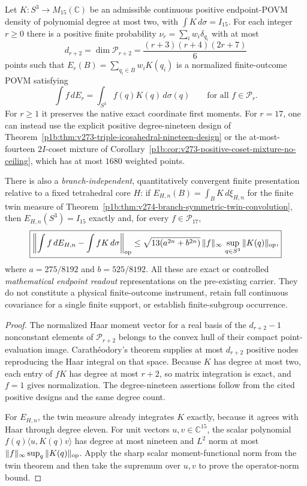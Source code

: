 \documentclass[11pt,a4paper]{article}
\begin{document}
\begin{corollary}
\label{p2f:cor:v274-finite-endpoint-moment-presentations}
Let $K:S^3\to M_{15}(\mathbb C)$ be an admissible continuous
positive endpoint-POVM density of polynomial degree at most two,
with $\int K\,d\sigma=I_{15}$. For each integer $r\ge0$ there is
a positive finite probability $\nu_r=\sum_iw_i\delta_{q_i}$ with
at most
\[
 d_{r+2}=\dim\mathcal P_{r+2}
   =\frac{(r+3)(r+4)(2r+7)}6
\]
points such that $E_r(B)=\sum_{q_i\in B}w_iK(q_i)$ is a normalized
finite-outcome POVM satisfying
\[
 \boxed{\int f\,dE_r=\int_{S^3}f(q)K(q)\,d\sigma(q)
       \qquad\text{for all } f\in\mathcal P_r.}
\]
For $r\ge1$ it preserves the native exact coordinate first moments.
For $r=17$, one can instead use the explicit positive degree-nineteen
design of Theorem~\ref{p1b:thm:v273-triple-icosahedral-nineteen-design}
or the at-most-fourteen $2I$-coset mixture of
Corollary~\ref{p1b:cor:v273-positive-coset-mixture-no-ceiling},
which has at most $1680$ weighted points.

There is also a \emph{branch-independent}, quantitatively convergent
finite presentation relative to a fixed tetrahedral core $H$: if
$E_{H,n}(B)=\int_BK\,d\xi_{H,n}$ for the finite twin measure of
Theorem~\ref{p1b:thm:v274-branch-symmetric-twin-convolution}, then
$E_{H,n}(S^3)=I_{15}$ exactly and, for every $f\in\mathcal P_{17}$,
\[
 \boxed{\left\|\int f\,dE_{H,n}-\int fK\,d\sigma\right\|_{\rm op}
 \le \sqrt{13(a^{2n}+b^{2n})}\,\|f\|_\infty\,
          \sup_{q\in S^3}\|K(q)\|_{\rm op},}
\]
where $a=275/8192$ and $b=525/8192$.
All these are exact or controlled \emph{mathematical endpoint readout}
representations on the pre-existing carrier. They do not constitute
a physical finite-outcome instrument, retain full continuous covariance
for a single finite support, or establish finite-subgroup occurrence.
\end{corollary}
\begin{proof}
The normalized Haar moment vector for a real basis of the
$d_{r+2}-1$ nonconstant elements of $\mathcal P_{r+2}$ belongs to
the convex hull of their compact point-evaluation image.
Carath\'eodory's theorem supplies at most $d_{r+2}$ positive
nodes reproducing the Haar integral on that space.
Because $K$ has degree at most two, each entry of $fK$ has degree
at most $r+2$, so matrix integration is exact, and $f=1$ gives
normalization. The degree-nineteen assertions follow from the cited
positive designs and the same degree count.

For $E_{H,n}$, the twin measure already integrates $K$ exactly,
because it agrees with Haar through degree eleven. For unit vectors
$u,v\in\mathbb C^{15}$, the scalar polynomial
$f(q)\langle u,K(q)v\rangle$ has degree at most nineteen and
$L^2$ norm at most
$\|f\|_\infty\sup_q\|K(q)\|_{\rm op}$. Apply the sharp scalar
moment-functional norm from the twin theorem and then take the
supremum over $u,v$ to prove the operator-norm bound.
\end{proof}
\end{document}
